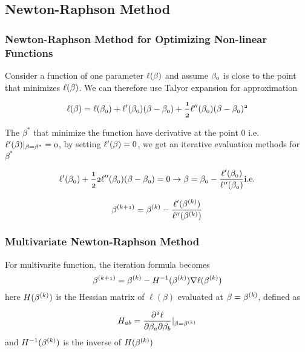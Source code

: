 \documentclass[notheorems, aspectratio=54]{beamer}
\begin{document}
\begin{frame}

\subsection{Newton-Raphson Method}

\frametitle{Newton-Raphson Method for Optimizing Non-linear Functions}
Consider a function of one parameter $\mathnormal{\ell(\beta)}$ and assume $\mathnormal{\beta_0}$ is close to the point that minimizes $\mathnormal{\ell(\beta)}$. We can therefore use Talyor expansion for approximation

$$
\mathnormal{\ell(\beta)=\ell(\beta_0)+\ell'(\beta_0)(\beta-\beta_0)+\frac{1}{2}\ell''(\beta_0)(\beta-\beta_0)^2}
$$

The $\beta^*$ that minimize the function have derivative at the point 0 i.e. $\mathnormal{\ell'(\beta)|_{\beta=\beta^*}=0}$, by setting $\mathnormal{\ell'(\beta)}=0$, we get an iterative evaluation methods for $\beta^*$

$$
\mathnormal{\ell'(\beta_0)+\frac{1}{2}2\ell''(\beta_0)(\beta-\beta_0)}=0
\rightarrow
\mathnormal{\beta=\beta_0-\frac{\ell'(\beta_0)}{\ell''(\beta_0)}} \text{i.e.}
$$

$$
\mathnormal{\beta^{(k+1)}=\beta^{(k)}-\frac{\ell'(\beta^{(k)})}{\ell''(\beta^{(k)})}}
$$
\end{frame}

\begin{frame}
\frametitle{Multivariate Newton-Raphson Method }
For multivarite function, the iteration formula becomes
$$
\mathnormal{\beta^{(k+1)}}=\mathnormal{\beta^{(k)}}-\mathnormal{H}^{-1}\mathnormal{(\beta^{(k)})\nabla \ell(\beta^{(k)})}
$$
here $\mathnormal{H(\beta^{(k)})}$ is the Hessian matrix of $\ell(\beta)$ evaluated at $\mathnormal{\beta=\beta^{(k)}}$, defined as

$$
\mathnormal{H_{ab}}=\mathnormal{\frac{\partial^2\ell}{\partial\beta_a\partial\beta_b}|_{\beta=\beta^{(k)}}}
$$
and $\mathnormal{H}^{-1}\mathnormal{(\beta^{(k)})}$ is the inverse of $\mathnormal{H(\beta^{(k)})}$

\end{frame}
\end{document}
